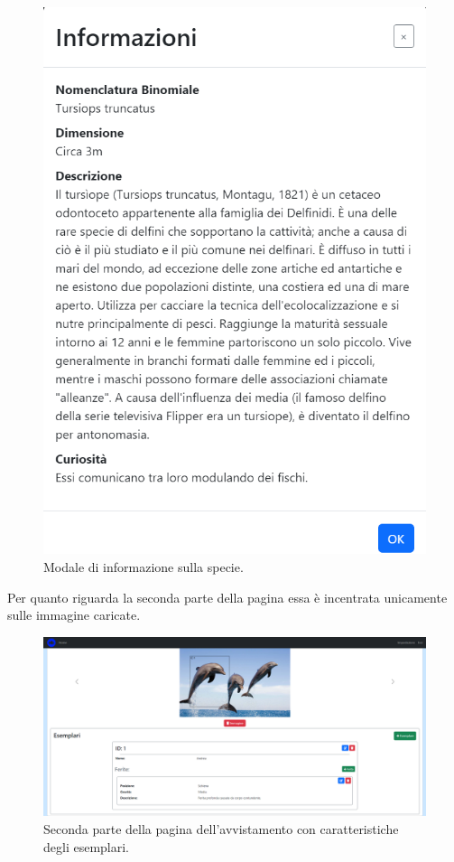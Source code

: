 \documentclass[a4paper,final,12pt]{report}
\begin{document}
\begin{figure}[hbtp]
\centering
\includegraphics[scale=0.65]{img_concettuale/info.png}
\caption{Modale di informazione sulla specie.}
\end{figure}
\newpage
Per quanto riguarda la seconda parte della pagina essa è incentrata unicamente sulle immagine caricate.
\begin{figure}[hbtp]
\centering
\includegraphics[scale=0.31]{img_concettuale/avvistamentoPAG2.png}
\caption{Seconda parte della pagina dell'avvistamento con caratteristiche degli esemplari.}
\end{figure}
\end{document}
